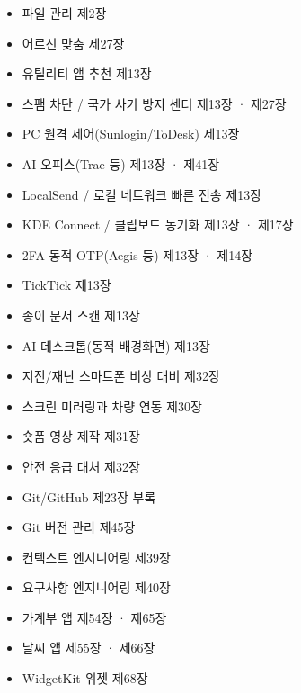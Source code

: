 
\begin{itemize}
  \item 파일 관리 제2장
  \item 어르신 맞춤 제27장
  \item 유틸리티 앱 추천 제13장
  \item 스팸 차단 / 국가 사기 방지 센터 제13장 · 제27장
  \item PC 원격 제어(Sunlogin/ToDesk) 제13장
  \item AI 오피스(Trae 등) 제13장 · 제41장
  \item LocalSend / 로컬 네트워크 빠른 전송 제13장
  \item KDE Connect / 클립보드 동기화 제13장 · 제17장
  \item 2FA 동적 OTP(Aegis 등) 제13장 · 제14장
  \item TickTick 제13장
  \item 종이 문서 스캔 제13장
  \item AI 데스크톱(동적 배경화면) 제13장
  \item 지진/재난 스마트폰 비상 대비 제32장
  \item 스크린 미러링과 차량 연동 제30장
  \item 숏폼 영상 제작 제31장
  \item 안전 응급 대처 제32장
  \item Git/GitHub 제23장 부록
  \item Git 버전 관리 제45장
  \item 컨텍스트 엔지니어링 제39장
  \item 요구사항 엔지니어링 제40장
  \item 가계부 앱 제54장 · 제65장
  \item 날씨 앱 제55장 · 제66장
  \item WidgetKit 위젯 제68장
\end{itemize}
